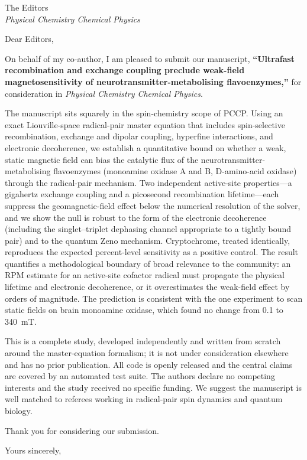\documentclass[11pt]{letter}
\begin{document}
\begin{letter}{The Editors\\ \emph{Physical Chemistry Chemical Physics}}
\opening{Dear Editors,}

On behalf of my co-author, I am pleased to submit our manuscript,
\textbf{``Ultrafast recombination and exchange coupling preclude weak-field
magnetosensitivity of neurotransmitter-metabolising flavoenzymes,''} for
consideration in \textit{Physical Chemistry Chemical Physics}.

The manuscript sits squarely in the spin-chemistry scope of PCCP. Using an exact
Liouville-space radical-pair master equation that includes spin-selective
recombination, exchange and dipolar coupling, hyperfine interactions, and
electronic decoherence, we establish a quantitative bound on whether a weak,
static magnetic field can bias the catalytic flux of the neurotransmitter-metabolising
flavoenzymes (monoamine oxidase A and B, D-amino-acid oxidase) through the
radical-pair mechanism. Two independent active-site properties---a gigahertz
exchange coupling and a picosecond recombination lifetime---each suppress the
geomagnetic-field effect below the numerical resolution of the solver, and we show
the null is robust to the form of the electronic decoherence (including the
singlet--triplet dephasing channel appropriate to a tightly bound pair) and to the
quantum Zeno mechanism. Cryptochrome, treated identically, reproduces the expected
percent-level sensitivity as a positive control. The result quantifies a
methodological boundary of broad relevance to the community: an RPM estimate for an
active-site cofactor radical must propagate the physical lifetime and electronic
decoherence, or it overestimates the weak-field effect by orders of magnitude. The
prediction is consistent with the one experiment to scan static fields on brain
monoamine oxidase, which found no change from 0.1 to 340~mT.

This is a complete study, developed independently and written from scratch around
the master-equation formalism; it is not under consideration elsewhere and has no
prior publication. All code is openly released and the central claims are covered
by an automated test suite. The authors declare no competing interests and the
study received no specific funding. We suggest the manuscript is well matched to
referees working in radical-pair spin dynamics and quantum biology.

Thank you for considering our submission.

\closing{Yours sincerely,}
\end{letter}
\end{document}

